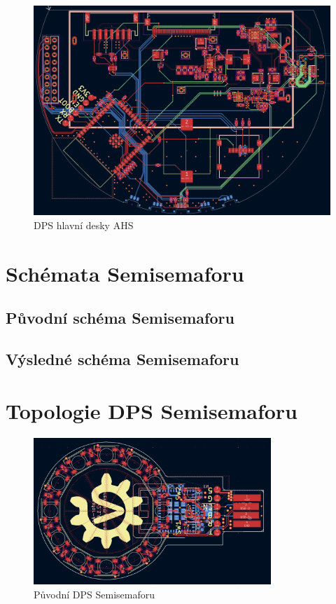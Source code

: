 \begin{figure}[!h]
	\begin{center}
	  \includegraphics[angle = -90, width=\textwidth]{text/PraktickaCast/img/AHS-DPS-HlavniDeska.png}
	\end{center}
	\caption{DPS hlavní desky AHS}
\end{figure}

\newpage

\chapter{Schémata Semisemaforu}
\section{Původní schéma Semisemaforu}


\section{Výsledné schéma Semisemaforu}


\chapter{Topologie DPS Semisemaforu}
\begin{figure}[!h]
	\begin{center}
	  \includegraphics[angle = -90, width=0.8\textwidth]{text/PraktickaCast/img/Semisemafor-PCB-V1.png}
	\end{center}
	\caption{Původní DPS Semisemaforu}
	\label{Semisemafor-pcb-v1}
\end{figure}
